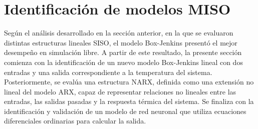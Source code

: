 \documentclass[11pt]{report}
\begin{document}

\section{Identificación de modelos MISO}

Según el análisis desarrollado en la sección anterior, en la que se evaluaron distintas estructuras lineales SISO, el modelo Box-Jenkins presentó el mejor desempeño en simulación libre. A partir de este resultado, la presente sección comienza con la identificación de un nuevo modelo Box-Jenkins lineal con dos entradas y una salida correspondiente a la temperatura del sistema. Posteriormente, se evalúa una estructura NARX, definida como una extensión no lineal del modelo ARX, capaz de representar relaciones no lineales entre las entradas, las salidas pasadas y la respuesta térmica del sistema. Se finaliza con la identificación y validación de un modelo de red neuronal que utiliza ecuaciones diferenciales ordinarias para calcular la salida.
\end{document}
